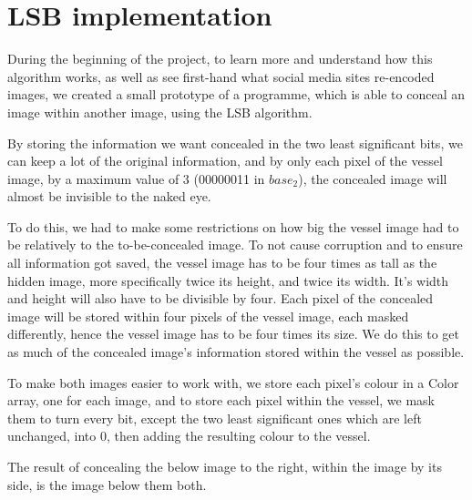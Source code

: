 \section{LSB implementation}
During the beginning of the project, to learn more and understand how this algorithm works, as well as see first-hand what social media sites re-encoded images, we created a small prototype of a programme, which is able to conceal an image within another image, using the LSB algorithm. 

By storing the information we want concealed in the two least significant bits, we can keep a lot of the original information, and by only each pixel of the vessel image, by a maximum value of 3 (00000011 in $base_2$), the concealed image will almost be invisible to the naked eye.

To do this, we had to make some restrictions on how big the vessel image had to be relatively to the to-be-concealed image. To not cause corruption and to ensure all information got saved, the vessel image has to be four times as tall as the hidden image, more specifically twice its height, and twice its width. It's width and height will also have to be divisible by four. Each pixel of the concealed image will be stored within four pixels of the vessel image, each masked differently, hence the vessel image has to be four times its size. We do this to get as much of the concealed image's information stored within the vessel as possible.

To make both images easier to work with, we store each pixel's colour in a Color array, one for each image, and to store each pixel within the vessel, we mask them to turn every bit, except the two least significant ones which are left unchanged, into 0, then adding the resulting colour to the vessel.

The result of concealing the below image to the right, within the image by its side, is the image below them both.

